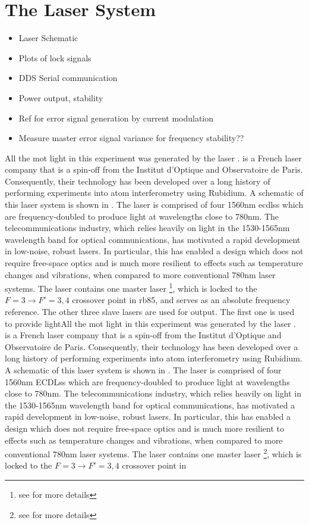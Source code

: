 \section{The \Muquans Laser System}\label{sec:setup_muquans}
\begin{itemize}
    \item Laser Schematic
    \item Plots of lock signals
    \item DDS Serial communication
    \item Power output, stability
    \item Ref for error signal generation by current modulation
    \item Measure master error signal variance for frequency stability??
\end{itemize}
All the \ac{mot} light in this experiment was generated by the \Muquans laser \cite{muquansWebPage}. \Muquans is a French laser company that is a spin-off from the Institut d'Optique and Observatoire de Paris. Consequently, their technology has been developed over a long history of performing experiments into atom interferometry using Rubidium. A schematic of this laser system is shown in . The \Muquans laser is comprised of four 1560nm \acp{ecdls} which are frequency-doubled to produce light at wavelengths close to 780nm. The telecommunications industry, which relies heavily on light in the 1530-1565nm wavelength band for optical communications, has motivated a rapid development in low-noise, robust lasers. In particular, this has enabled a design which does not require free-space optics and is much more resilient to effects such as temperature changes and vibrations, when compared to more conventional 780nm laser systems. The \Muquans laser contains one master laser \footnote{see  for more details}, which is locked to the \(F = 3 \rightarrow F' = 3,4\) crossover point in \ac{rb85}, and serves as an absolute frequency reference. The other three slave lasers are used for output. The first one is used to provide lightAll the \ac{mot} light in this experiment was generated by the \Muquans laser \cite{muquansWebPage}. \Muquans is a French laser company that is a spin-off from the Institut d'Optique and Observatoire de Paris. Consequently, their technology has been developed over a long history of performing experiments into atom interferometry using Rubidium. A schematic of this laser system is shown in . The \Muquans laser is comprised of four 1560nm \acp{ECDLs} which are frequency-doubled to produce light at wavelengths close to 780nm. The telecommunications industry, which relies heavily on light in the 1530-1565nm wavelength band for optical communications, has motivated a rapid development in low-noise, robust lasers. In particular, this has enabled a design which does not require free-space optics and is much more resilient to effects such as temperature changes and vibrations, when compared to more conventional 780nm laser systems. The \Muquans laser contains one master laser \footnote{see  for more details}, which is locked to the \(F = 3 \rightarrow F' = 3,4\) crossover point in 